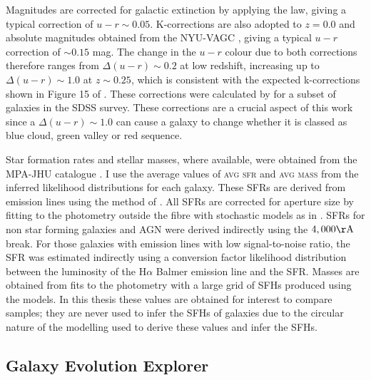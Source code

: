 Magnitudes are corrected for galactic extinction \citep{Oh11} by applying the \citet{Cardelli89} law, giving a typical correction of $u-r \sim 0.05$. K-corrections are also adopted to $z=0.0$ and absolute magnitudes obtained from the NYU-VAGC \citep{Blanton05, padmanabhan08, blanton07}, giving a typical $u-r$ correction of $\sim 0.15$ mag. The change in the $u-r$ colour due to both corrections therefore ranges from $\Delta (u-r) \sim 0.2$ at low redshift, increasing up to $\Delta (u-r) \sim 1.0$ at $z \sim 0.25$, which is consistent with the expected k-corrections shown in Figure 15 of \citet{blanton07}. These corrections were calculated by \citet{Bamford09} for a subset of galaxies in the SDSS survey. These corrections are a crucial aspect of this work since a $\Delta (u-r) \sim 1.0$ can cause a galaxy to change whether it is classed as blue cloud, green valley or red sequence.

Star formation rates and stellar masses, where available, were obtained from the MPA-JHU catalogue \citep{kauffmann03, brinchmann04}.  I use the average values of \textsc{avg sfr} and \textsc{avg mass} from the inferred likelihood distributions for each galaxy. These SFRs are derived from emission lines using the method of \cite{charlot01}. All SFRs are corrected for aperture size by fitting to the photometry outside the fibre with stochastic models as in \cite{Salim07}. SFRs for non star forming galaxies and AGN were derived indirectly using the $4,000 \rm{\AA}$ break. For those galaxies with emission lines with low signal-to-noise ratio, the SFR was estimated indirectly using a conversion factor likelihood distribution between the luminosity of the H$\alpha$ Balmer emission line and the SFR. Masses are obtained from fits to the photometry with a large grid of SFHs produced using the \cite{BC03} models. In this thesis these values are obtained for interest to compare samples; they are never used to infer the SFHs of galaxies due to the circular nature of the modelling used to derive these values and infer the SFHs.

\subsection{Galaxy Evolution Explorer}\label{sec:galexintro}

